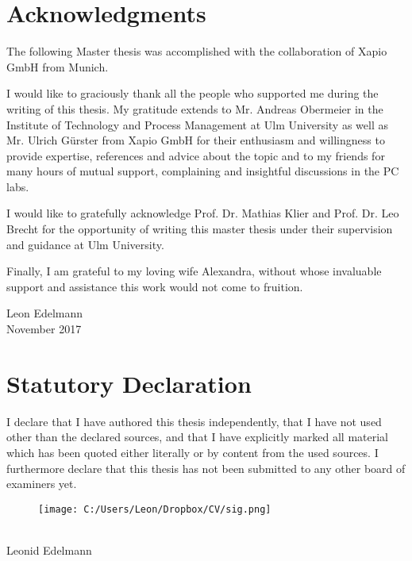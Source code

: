 \section*{Acknowledgments}

The following Master thesis was accomplished with the collaboration of Xapio GmbH from Munich. 

\hspace{0.7cm}

I would like to graciously thank all the people who supported me during the writing of this thesis. My gratitude extends to Mr. Andreas Obermeier in the Institute of Technology and Process Management at Ulm University as well as Mr. Ulrich G\"urster from Xapio GmbH for their enthusiasm and willingness to provide expertise, references and advice about the topic and to my friends for many hours of mutual support, complaining and insightful discussions in the PC labs.

\hspace{0.7cm}

I would like to gratefully acknowledge Prof. Dr. Mathias Klier and Prof. Dr. Leo Brecht for the opportunity of writing this master thesis under their supervision and guidance at Ulm University.

\hspace{0.7cm}

Finally, I am grateful to my loving wife Alexandra, without whose invaluable support and assistance this work would not come to fruition.

\hspace{0.7cm}

\begin{flushright}
	Leon Edelmann\\
	November 2017
\end{flushright}

\newpage

\section*{Statutory Declaration}

I declare that I have authored this thesis independently, that I have not used other than the declared sources, and that I have explicitly marked all material which has been quoted either literally or by content from the used sources. I furthermore declare that this thesis has not been submitted to any other board of examiners yet.


\vspace{2cm}
\begin{figure}[H]
	\texttt{[image: C:/Users/Leon/Dropbox/CV/sig.png]}
\end{figure}
\vspace{-1.3cm}
\underline{\hspace{3cm}} \\
Leonid Edelmann

\newpage